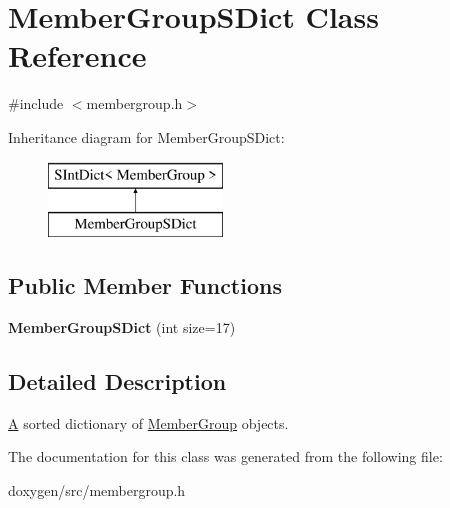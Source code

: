 \hypertarget{class_member_group_s_dict}{}\section{Member\+Group\+S\+Dict Class Reference}
\label{class_member_group_s_dict}


{\ttfamily \#include $<$membergroup.\+h$>$}

Inheritance diagram for Member\+Group\+S\+Dict\+:\begin{figure}[H]
\begin{center}
\leavevmode
\includegraphics[height=2.000000cm]{class_member_group_s_dict}
\end{center}
\end{figure}
\subsection*{Public Member Functions}
\begin{DoxyCompactItemize}
\item 
\mbox{\label{class_member_group_s_dict_aa8c39c4f71040c295bac3f3169512185}} 
{\bfseries Member\+Group\+S\+Dict} (int size=17)
\end{DoxyCompactItemize}


\subsection{Detailed Description}
\mbox{\hyperlink{class_a}{A}} sorted dictionary of \mbox{\hyperlink{class_member_group}{Member\+Group}} objects. 

The documentation for this class was generated from the following file\+:\begin{DoxyCompactItemize}
\item 
doxygen/src/membergroup.\+h\end{DoxyCompactItemize}
